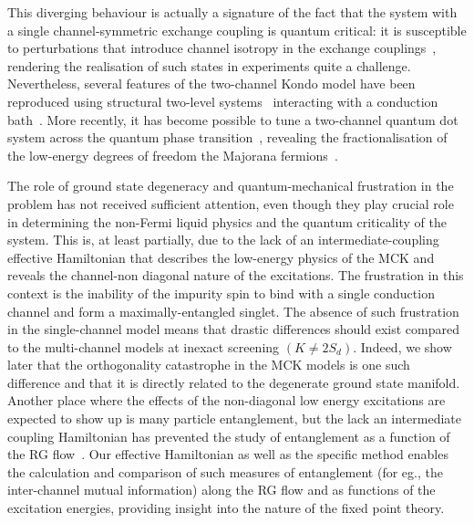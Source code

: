 \documentclass[reprint,prb,superscriptaddress]{revtex4-2}
\begin{document}
{This diverging behaviour is actually a signature of the fact that the system with a single channel-symmetric exchange coupling is quantum critical: it is susceptible to perturbations that introduce channel isotropy in the exchange couplings~\cite{Noz_blandin_1980,andrei_jerez_1995,affleck_pang_cox_1992,zarand_2000,zheng_2021}, rendering the realisation of such states in experiments quite a challenge.
Nevertheless, several features of the two-channel Kondo model have been reproduced using structural two-level systems~\cite{zawadowski_1980,vladar_1983} interacting with a conduction bath~\cite{cichorek_2005,ralph_buhrman_1992,ralph_ludwig_1994,Iftikhar2015,Zhu2016}.
More recently, it has become possible to tune a two-channel quantum dot system across the quantum phase transition~\cite{Potok2007,Keller2015}, revealing the fractionalisation of the low-energy degrees of freedom the Majorana fermions~\cite{emery1995,Coleman_tsvelik,mebrahtu_2013}.

The role of ground state degeneracy and quantum-mechanical frustration in the problem has not received sufficient attention, even though they play crucial role in determining the non-Fermi liquid physics and the quantum criticality of the system.
This is, at least partially, due to the lack of an intermediate-coupling effective Hamiltonian that describes the low-energy physics of the MCK and reveals the channel-non diagonal nature of the excitations.
The frustration in this context is the inability of the impurity spin to bind with a single conduction channel and form a maximally-entangled singlet.
The absence of such frustration in the single-channel model means that drastic differences should exist compared to the multi-channel models at inexact screening \((K \neq 2S_d)\).
Indeed, we show later that the orthogonality catastrophe in the MCK models is one such difference and that it is directly related to the degenerate ground state manifold.
Another place where the effects of the non-diagonal low energy excitations are expected to show up is many particle entanglement, but the lack an intermediate coupling Hamiltonian has prevented the study of entanglement as a function of the RG flow~\cite{alkurtass_affleck_2016,kim_shim_2021}. Our effective Hamiltonian as well as the specific method enables the calculation and comparison of such measures of entanglement (for eg., the inter-channel mutual information) along the RG flow and as functions of the excitation energies, providing insight into the nature of the fixed point theory.
}
\end{document}
